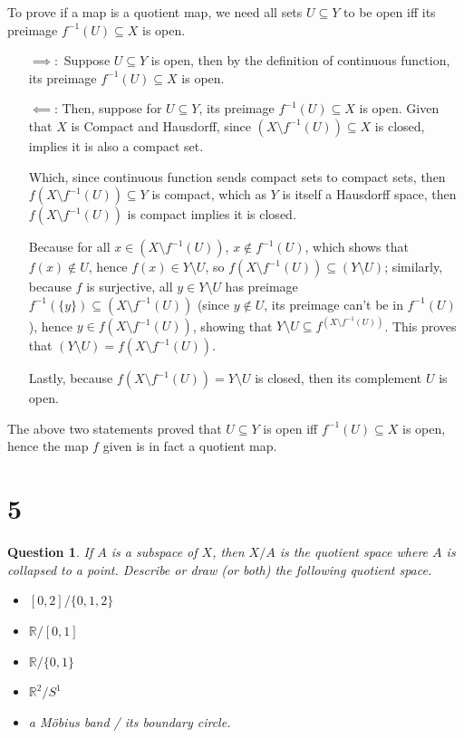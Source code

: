 \documentclass{article}
\newtheorem{question}{Question}
\begin{document}
To prove if a map is a quotient map, we need all sets $U\subseteq Y$ to be open iff its preimage $f^{-1}(U)\subseteq X$ is open.

\hfil

\begin{itemize}
    \item[$\implies:$] Suppose $U\subseteq Y$ is open, then by the definition of continuous function, its preimage $f^{-1}(U)\subseteq X$ is open.

    \hfil

    \item[$\impliedby$:] Then, suppose for $U\subseteq Y$, its preimage $f^{-1}(U)\subseteq X$ is open.
    Given that $X$ is Compact and Hausdorff, since $(X\setminus f^{-1}(U))\subseteq X$ is closed, implies it is also a compact set.
    
    Which, since continuous function sends compact sets to compact sets, then $f(X\setminus f^{-1}(U))\subseteq Y$ is compact,
    which as $Y$ is itself a Hausdorff space, then $f(X\setminus f^{-1}(U))$ is compact implies it is closed.
    
    Because for all $x\in (X\setminus f^{-1}(U))$, $x \notin f^{-1}(U)$, which shows that $f(x)\notin U$, hence $f(x)\in Y\setminus U$,
    so $f(X\setminus f^{-1}(U))\subseteq (Y\setminus U)$;
    similarly, because $f$ is surjective, all $y\in Y\setminus U$ has preimage $f^{-1}(\{y\})\subseteq (X\setminus f^{-1}(U))$
    (since $y\notin U$, its preimage can't be in $f^{-1}(U)$), hence $y\in f(X\setminus f^{-1}(U))$,
    showing that $Y\setminus U\subseteq f^(X\setminus f^{-1}(U))$. This proves that $(Y\setminus U)=f(X\setminus f^{-1}(U))$.
    
    Lastly, because $f(X\setminus f^{-1}(U)) = Y\setminus U$ is closed, then its complement $U$ is open.
\end{itemize}

\hfil

The above two statements proved that $U\subseteq Y$ is open iff $f^{-1}(U)\subseteq X$ is open, hence the map $f$ given is in fact a quotient map.

\break

\section*{5}
\begin{myBox}[]{}
    \begin{question}
        If $A$ is a subspace of $X$, then $X/A$ is the quotient space where $A$ is collapsed to a point.
        Describe or draw (or both) the following quotient space.
        \begin{itemize}
            \item $[0,2]/\{0,1,2\}$
            \item $\mathbb{R}/[0,1]$
            \item $\mathbb{R}/\{0,1\}$
            \item $\mathbb{R}^2/S^1$
            \item a Möbius band / its boundary circle.
        \end{itemize}
    \end{question}
\end{myBox}
\end{document}
